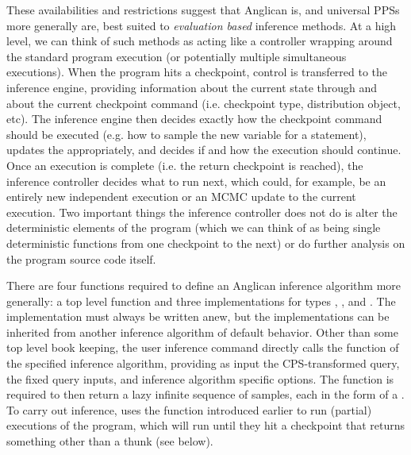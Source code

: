 These availabilities and restrictions suggest that Anglican is, and universal PPSs more generally are,
best suited to \emph{evaluation based} inference methods.  At a high level, we can think of such methods
as acting like a controller wrapping around the standard program
execution (or potentially multiple simultaneous executions).  When the program hits a checkpoint,
control is transferred to the inference engine, providing information about the current state through
\angstate and about the current checkpoint command (i.e. checkpoint type, distribution object, etc).
The inference engine then decides exactly how the checkpoint command should be executed (e.g. how to
sample the new variable for a \sample statement), updates the \angstate appropriately, and decides if
and how the execution should continue.  Once an execution is complete (i.e. the return checkpoint
is reached), the inference controller decides what to run next, which could, for example, be an entirely new independent
execution or an MCMC update to the current execution.  Two important things the inference controller
does not do is alter the deterministic elements of the program (which we can think of as being single
deterministic functions from one checkpoint to the next)
or do further analysis on the program source code itself.  

There are four functions required to define an Anglican inference algorithm more generally: a top level 
\anginfer function and three \checkpoint implementations
for types , , and  .  The \anginfer
implementation must always be written anew, but the \checkpoint implementations can be inherited from
another inference algorithm of default behavior.  Other than some top level book keeping, the user
inference command \doquery directly calls the \anginfer function of the specified inference algorithm, providing
as input the CPS-transformed query, the fixed query inputs, and inference algorithm specific options.
The \anginfer function is required to then return a lazy infinite sequence of samples, each in the form of
a \angstate.  To carry out inference, \anginfer uses the  function introduced earlier
to run (partial) executions of the program, which will run until they hit a checkpoint that returns something
other than a thunk (see below).  

